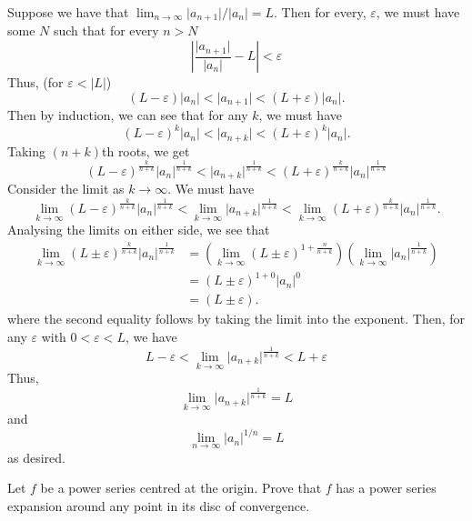 \documentclass[12 pt, letterpaper]{hmcpset}
\begin{document}
\begin{solution}
	Suppose we have that $\lim_{n \to \infty} \lvert a_{n + 1} \rvert/\lvert a_{n} \rvert = L$. Then for every, $\varepsilon$, we must have some $N$ such that for every $n > N$
	 \[
		\left \lvert \frac{\lvert a_{n + 1} \rvert}{\lvert a_{n} \rvert} - L \right \rvert < \varepsilon
	\]
	Thus, (for $\varepsilon < \lvert L \rvert$)
	\[
		(L - \varepsilon) \lvert a_{n} \rvert < \lvert a_{n + 1} \rvert < (L + \varepsilon) \lvert a_{n} \rvert. 
	\]
	Then by induction, we can see that for any $k$, we must have
	\[
		(L - \varepsilon)^{k} \lvert a_{n} \rvert < \lvert a_{n + k} \rvert < (L + \varepsilon)^{k} \lvert a_{n} \rvert.
	\]
	Taking $(n + k)$th roots, we get
	\[
		(L - \varepsilon)^{\frac{k}{n + k}} \lvert a_{n} \rvert^{\frac{1}{n + k}} < \lvert a_{n + k} \rvert^{\frac{1}{n + k}} < (L + \varepsilon)^{\frac{k}{n + k}} \lvert a_{n} \rvert^{\frac{1}{n + k}}
	\]
	Consider the limit as $k \to \infty$. We must have
	\[
		\lim_{k \to \infty} (L - \varepsilon)^{\frac{k}{n + k}} \lvert a_{n} \rvert^{\frac{1}{n + k}} < \lim_{k \to \infty} \lvert a_{n + k} \rvert^{\frac{1}{n + k}} < \lim_{k \to \infty} (L + \varepsilon)^{\frac{k}{n + k}} \lvert a_{n} \rvert^{\frac{1}{n + k}}.
	\]
	Analysing the limits on either side, we see that
	\[
		\begin{split}
			\lim_{k \to \infty} (L \pm \varepsilon)^{\frac{k}{n + k}} \lvert a_{n} \rvert^{\frac{1}{n + k}} & = \left ( \lim_{k \to \infty} (L \pm \varepsilon)^{1 + \frac{n}{n + k}} \right ) \left ( \lim_{k \to \infty} \lvert a_{n} \rvert^{\frac{1}{n + k}} \right ) \\
															& = (L \pm \varepsilon)^{1 + 0} \lvert a_{n} \rvert^{0} \\
															& = (L \pm \varepsilon).
		\end{split}
	\]
	where the second equality follows by taking the limit into the exponent. Then, for any $\varepsilon$ with $0 < \varepsilon < L$, we have
	\[
		L - \varepsilon < \lim_{k \to \infty} \lvert a_{n + k} \rvert^{\frac{1}{n + k}} < L + \varepsilon
	\]
	Thus,
	\[
		\lim_{k \to \infty} \lvert a_{n + k} \rvert^{\frac{1}{n + k}} =  L
	\]
	and
	\[
		\lim_{n \to \infty} \lvert a_{n} \rvert^{1 / n} = L
	\]
	as desired.
\end{solution}

\pagebreak

\begin{problem}[18.]
	Let $f$ be a power series centred at the origin. Prove that $f$ has a power series expansion around any point in its disc of convergence.
\end{problem}
\end{document}
